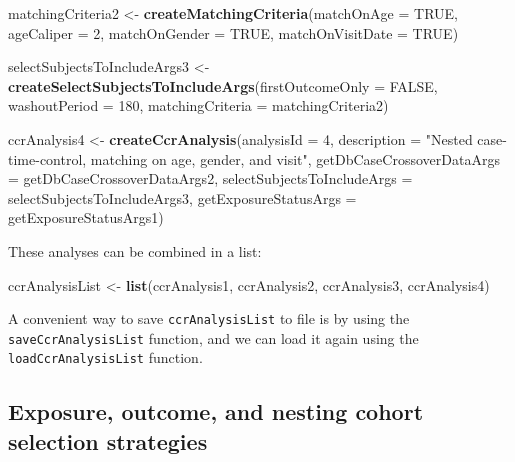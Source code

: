 \documentclass[]{article}
\newenvironment{Shaded}{\begin{snugshade}}{\end{snugshade}}
\newcommand{\DataTypeTok}[1]{\textcolor[rgb]{0.13,0.29,0.53}{#1}}
\newcommand{\DecValTok}[1]{\textcolor[rgb]{0.00,0.00,0.81}{#1}}
\newcommand{\KeywordTok}[1]{\textcolor[rgb]{0.13,0.29,0.53}{\textbf{#1}}}
\newcommand{\NormalTok}[1]{#1}
\newcommand{\OtherTok}[1]{\textcolor[rgb]{0.56,0.35,0.01}{#1}}
\newcommand{\StringTok}[1]{\textcolor[rgb]{0.31,0.60,0.02}{#1}}
\begin{document}
\begin{Shaded}
\begin{Highlighting}[]
\NormalTok{matchingCriteria2 <-}\StringTok{ }\KeywordTok{createMatchingCriteria}\NormalTok{(}\DataTypeTok{matchOnAge =} \OtherTok{TRUE}\NormalTok{,}
                                            \DataTypeTok{ageCaliper =} \DecValTok{2}\NormalTok{,}
                                            \DataTypeTok{matchOnGender =} \OtherTok{TRUE}\NormalTok{,}
                                            \DataTypeTok{matchOnVisitDate =} \OtherTok{TRUE}\NormalTok{)}

\NormalTok{selectSubjectsToIncludeArgs3 <-}\StringTok{ }\KeywordTok{createSelectSubjectsToIncludeArgs}\NormalTok{(}\DataTypeTok{firstOutcomeOnly =} \OtherTok{FALSE}\NormalTok{,}
                                                                  \DataTypeTok{washoutPeriod =} \DecValTok{180}\NormalTok{,}
                                                                  \DataTypeTok{matchingCriteria =}\NormalTok{ matchingCriteria2)}

\NormalTok{ccrAnalysis4 <-}\StringTok{ }\KeywordTok{createCcrAnalysis}\NormalTok{(}\DataTypeTok{analysisId =} \DecValTok{4}\NormalTok{,}
                                \DataTypeTok{description =} \StringTok{"Nested case-time-control, matching on age, gender, and visit"}\NormalTok{,}
                                \DataTypeTok{getDbCaseCrossoverDataArgs =}\NormalTok{ getDbCaseCrossoverDataArgs2,}
                                \DataTypeTok{selectSubjectsToIncludeArgs =}\NormalTok{ selectSubjectsToIncludeArgs3,}
                                \DataTypeTok{getExposureStatusArgs =}\NormalTok{ getExposureStatusArgs1)}
\end{Highlighting}
\end{Shaded}

These analyses can be combined in a list:

\begin{Shaded}
\begin{Highlighting}[]
\NormalTok{ccrAnalysisList <-}\StringTok{ }\KeywordTok{list}\NormalTok{(ccrAnalysis1, ccrAnalysis2, ccrAnalysis3, ccrAnalysis4)}
\end{Highlighting}
\end{Shaded}

A convenient way to save \texttt{ccrAnalysisList} to file is by using
the \texttt{saveCcrAnalysisList} function, and we can load it again
using the \texttt{loadCcrAnalysisList} function.

\hypertarget{exposure-outcome-and-nesting-cohort-selection-strategies}{%
\subsection{Exposure, outcome, and nesting cohort selection
strategies}\label{exposure-outcome-and-nesting-cohort-selection-strategies}}
\end{document}
